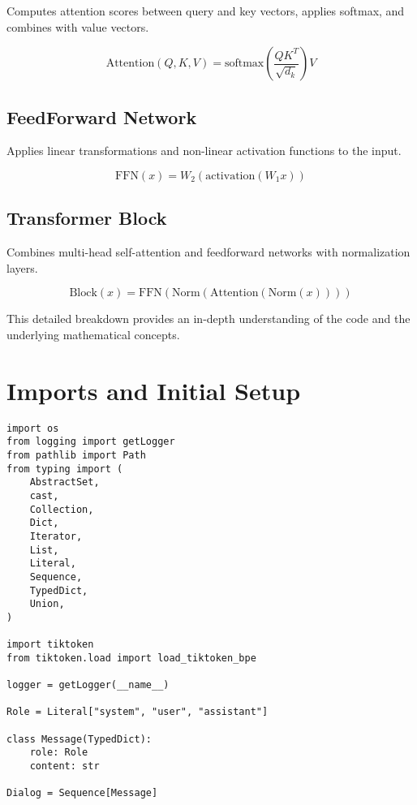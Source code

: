 Computes attention scores between query and key vectors, applies softmax, and combines with value vectors.

\begin{equation}
\text{Attention}(Q, K, V) = \text{softmax}\left(\frac{Q K^T}{\sqrt{d_k}}\right) V
\end{equation}

\subsection{FeedForward Network}

Applies linear transformations and non-linear activation functions to the input.

\begin{equation}
\text{FFN}(x) = W_2 (\text{activation}(W_1 x))
\end{equation}

\subsection{Transformer Block}

Combines multi-head self-attention and feedforward networks with normalization layers.

\begin{equation}
\text{Block}(x) = \text{FFN}(\text{Norm}(\text{Attention}(\text{Norm}(x))))
\end{equation}

This detailed breakdown provides an in-depth understanding of the code and the underlying mathematical concepts.

% 

% 
\section{Imports and Initial Setup}

\begin{lstlisting}
import os
from logging import getLogger
from pathlib import Path
from typing import (
    AbstractSet,
    cast,
    Collection,
    Dict,
    Iterator,
    List,
    Literal,
    Sequence,
    TypedDict,
    Union,
)

import tiktoken
from tiktoken.load import load_tiktoken_bpe

logger = getLogger(__name__)

Role = Literal["system", "user", "assistant"]

class Message(TypedDict):
    role: Role
    content: str

Dialog = Sequence[Message]
\end{lstlisting}

